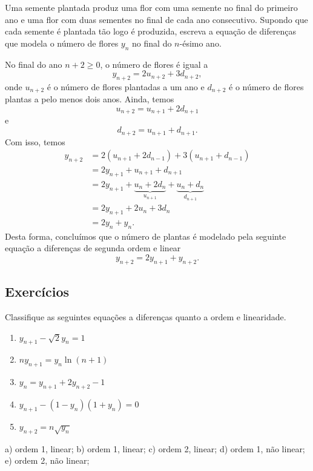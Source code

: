 \begin{exeresol}
  Uma semente plantada produz uma flor com uma semente no final do primeiro ano e uma flor com duas sementes no final de cada ano consecutivo. Supondo que cada semente é plantada tão logo é produzida, escreva a equação de diferenças que modela o número de flores $y_n$ no final do $n$-ésimo ano.
\end{exeresol}
\begin{resol}
  No final do ano $n+2\geq 0$, o número de flores é igual a
  \begin{equation}
    y_{n+2} = 2u_{n+2} + 3d_{n+2},
  \end{equation}
  onde $u_{n+2}$ é o número de flores plantadas a um ano e $d_{n+2}$ é o número de flores plantas a pelo menos dois anos. Ainda, temos
  \begin{equation}
    u_{n+2} = u_{n+1} + 2d_{n+1}
  \end{equation}
  e
  \begin{equation}
    d_{n+2} = u_{n+1} + d_{n+1}.
  \end{equation}
  Com isso, temos
  \begin{align}
    y_{n+2} &= 2(u_{n+1}+2d_{n-1}) + 3(u_{n+1}+d_{n-1}) \\
          &= 2y_{n+1} + u_{n+1} + d_{n+1} \\
          &= 2y_{n+1} + \underbrace{u_{n} + 2d_{n}}_{u_{n+1}} + \underbrace{u_{n} + d_{n}}_{d_{n+1}} \\
          &= 2y_{n+1} + 2u_{n} + 3d_{n} \\
          &= 2y_{n} + y_{n}.
  \end{align}
  Desta forma, concluímos que o número de plantas é modelado pela seguinte equação a diferenças de segunda ordem e linear
  \begin{equation}
    y_{n+2} = 2y_{n+1} + y_{n+2}.
  \end{equation}
\end{resol}

\subsection*{Exercícios}

\begin{exer}
  Classifique as seguintes equações a diferenças quanto a ordem e linearidade.
  \begin{enumerate}
  \item $\displaystyle y_{n+1}-\sqrt{2}y_{n} = 1$
  \item $\displaystyle ny_{n+1} = y_{n}\ln(n+1)$
  \item $\displaystyle y_{n} = y_{n+1} + 2y_{n+2} - 1$
  \item $\displaystyle y_{n+1} - (1-y_n)(1+y_n) = 0$
  \item $\displaystyle y_{n+2} = n\sqrt{y_n}$
  \end{enumerate}
\end{exer}
\begin{resp}
  a) ordem 1, linear; b) ordem 1, linear; c) ordem 2, linear; d) ordem 1, não linear; e) ordem 2, não linear;
\end{resp}

